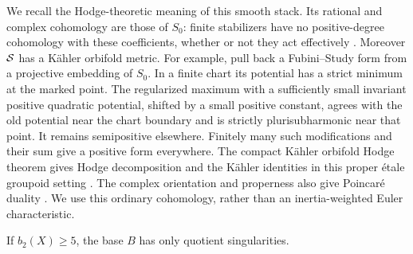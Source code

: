 We recall the Hodge-theoretic meaning of this smooth stack.  Its rational
and complex cohomology are those of $S_0$: finite stabilizers have no
positive-degree cohomology with these coefficients, whether or not
they act effectively \cite[Proposition~36]{Behrend2004}.
Moreover $\mathcal S$ has a K\"ahler orbifold metric.
For example, pull back a Fubini--Study form from a projective embedding
of $S_0$.  In a finite chart its potential has a strict minimum at the
marked point.  The regularized maximum with a sufficiently small
invariant positive quadratic potential, shifted by a small positive
constant, agrees with the old potential near the chart boundary and
is strictly plurisubharmonic near that point.  It remains semipositive
elsewhere.  Finitely many such modifications and their sum give a
positive form everywhere.  The compact K\"ahler orbifold Hodge theorem gives Hodge decomposition
and the K\"ahler identities in this proper \'etale groupoid setting
\cite[Definition~5.23 and Theorems~5.26--5.28]{MilanovSaito}.
The complex orientation and properness also give Poincar\'e duality
\cite[Corollary~25]{Behrend2004}.  We use this ordinary cohomology, rather than an inertia-weighted
Euler characteristic.

\begin{proposition}\label{def:large-betti}
If $b_2(X)\geq5$, the base $B$ has only quotient singularities.
\end{proposition}

